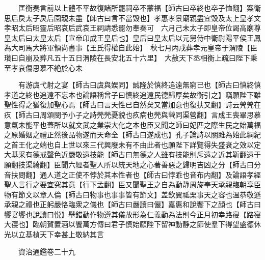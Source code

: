 　　匡衡奏言前以上體不平故復諸所罷祠卒不蒙福【師古曰卒終也卒子恤翻】案衛思后戾太子戾后園親未盡【師古曰言不當毁也】孝惠孝景廟親盡宜毁及太上皇孝文孝昭太后昭靈后昭哀后武哀王祠請悉罷勿奉奏可　六月己未太子即皇帝位謁高廟尊皇太后曰太皇太后【宣帝卬成王皇后也】皇后曰皇太后以元舅侍中衛尉陽平侯王鳳為大司馬大將軍領尚書事【王氏得權自此始】　秋七月丙戌葬孝元皇帝于渭陵【臣瓚曰自崩及葬凡五十五日渭陵在長安北五十六里】　大赦天下丞相衡上疏曰陛下秉至孝哀傷思慕不絶於心未

　　有游虞弋射之宴【師古曰虞與娱同】誠隆於慎終追遠無窮已也【師古曰慎終慎孝道之終也追遠不忘本也論語稱曾子曰慎終追遠民德歸厚矣故衡引之】竊願陛下雖聖性得之猶復加聖心焉【師古曰言天性已自然矣又當加意也復扶又翻】詩云焭焭在疚【師古曰周頌閔予小子之詩焭焭憂貌也疚病也焭與煢同渠營翻】言成王喪畢思慕意氣未能平也蓋所以就文武之業崇大化之本也臣又聞之師曰妃匹之際生民之始萬福之原婚姻之禮正然後品物遂而天命全【師古曰遂成也】孔子論詩以關雎為始此綱紀之首王化之端也自上世以來三代興廢未有不由此者也願陛下詳覽得失盛衰之效以定大基采有德戒聲色近嚴敬遠技能【師古曰無德之人雖有技能則斥遠之近其靳翻遠于願翻技渠綺翻】臣聞六經者聖人所以統天地之心著善惡之歸明吉凶之分【師古曰分音扶問翻】通人道之正使不悖於其本性者也【師古曰悖乖也音布内翻】及論語孝經聖人言行之要宜究其意【行下孟翻】臣又聞聖王之自為動静周旋奉天承親臨朝享臣物有節文以章人倫【師古曰物事也事事皆有節文】盖欽翼祗栗事天之容也温恭敬遜承親之禮也正躬嚴恪臨衆之儀也【師古曰嚴讀曰儼】嘉惠和說饗下之顔也【師古曰饗宴饗也說讀曰悦】舉錯動作物遵其儀故形為仁義動為法則今正月初幸路寑【路寑大寑也】臨朝賀置酒以饗萬方傳曰君子慎始願陛下留神動静之節使羣下得望盛德休光以立基楨天下幸甚上敬納其言

　　資治通鑑卷二十九


    


 


 



 

 
  







 


　　
　　
　
　
　


　　

　















